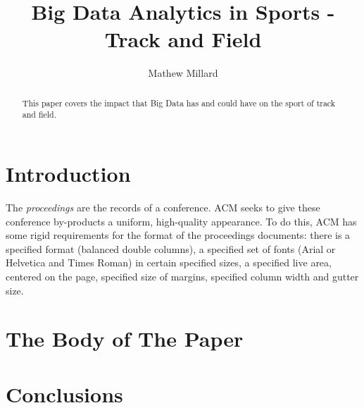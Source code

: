\documentclass[sigconf]{acmart}
\begin{document}
\title{Big Data Analytics in Sports - Track and Field}


\author{Mathew Millard}


\begin{abstract}
This paper covers the impact that Big Data has and could have on the sport of track and field.
\end{abstract}



\maketitle

\section{Introduction}

The \textit{proceedings} are the records of a
conference. ACM seeks to give these
conference by-products a uniform, high-quality appearance.  To do
this, ACM has some rigid requirements for the format of the
proceedings documents: there is a specified format (balanced double
columns), a specified set of fonts (Arial or Helvetica and Times
Roman) in certain specified sizes, a specified live area, centered on
the page, specified size of margins, specified column width and gutter
size.

\section{The Body of The Paper}



\section{Conclusions}



 
\end{document}
